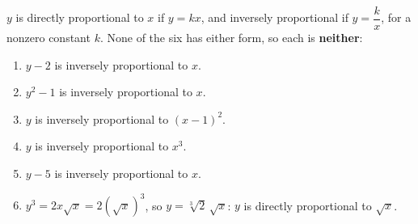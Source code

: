 $y$ is directly proportional to $x$ if $y=kx$, and inversely proportional if $y=\dfrac kx$, for a nonzero constant $k$. None of the six has either form, so each is \textbf{neither}:
\begin{enumerate}
\item[(1)] $y-2$ is inversely proportional to $x$.
\item[(2)] $y^2-1$ is inversely proportional to $x$.
\item[(3)] $y$ is inversely proportional to $(x-1)^2$.
\item[(4)] $y$ is inversely proportional to $x^3$.
\item[(5)] $y-5$ is inversely proportional to $x$.
\item[(6)] $y^3=2x\sqrt x=2\left(\sqrt x\right)^3$, so $y=\sqrt[3]2\,\sqrt x$: $y$ is directly proportional to $\sqrt x$.
\end{enumerate}
